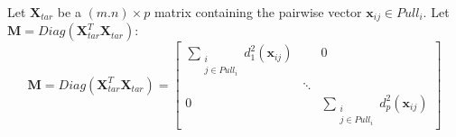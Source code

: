 \noindent Let $\textbf{X}_{tar}$ be a $(m.n) \times p$ matrix containing the pairwise vector $\textbf{x}_{ij} \in Pull_i$. Let $\textbf{M} = Diag(\textbf{X}_{tar}^T\textbf{X}_{tar}):$
\begin{equation}
	\textbf{M} = Diag(\textbf{X}_{tar}^T\textbf{X}_{tar}) = 
	\begin{bmatrix} 
		\sum\limits_{\substack{i \\ j \in Pull_i}} d_1^2(\textbf{x}_{ij}) 		&  	& 0 \\ 
			& \ddots 	&  \\ 
		0 		&  	& \sum\limits_{\substack{i \\ j \in Pull_i}} d_p^2(\textbf{x}_{ij})
		\end{bmatrix}
\end{equation}

